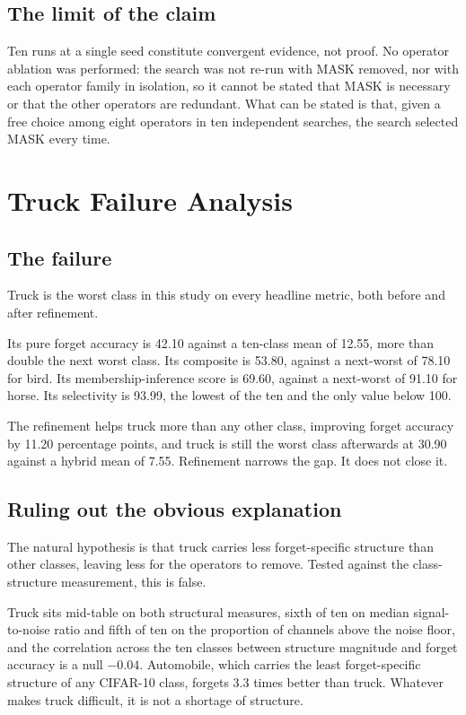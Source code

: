 \subsection{The limit of the claim}

Ten runs at a single seed constitute convergent evidence, not proof. No operator
ablation was performed: the search was not re-run with MASK removed, nor with each
operator family in isolation, so it cannot be stated that MASK is necessary or
that the other operators are redundant. What can be stated is that, given a free
choice among eight operators in ten independent searches, the search selected MASK
every time.

\section{Truck Failure Analysis}
\label{sec:exp-truck}

\subsection{The failure}

Truck is the worst class in this study on every headline metric, both before and
after refinement.

Its pure forget accuracy is 42.10 against a ten-class mean of 12.55, more than
double the next worst class. Its composite is 53.80, against a next-worst of 78.10
for bird. Its membership-inference score is 69.60, against a next-worst of 91.10
for horse. Its selectivity is 93.99, the lowest of the ten and the only value below
100.

The refinement helps truck more than any other class, improving forget accuracy by
11.20 percentage points, and truck is still the worst class afterwards at 30.90
against a hybrid mean of 7.55. Refinement narrows the gap. It does not close it.

\subsection{Ruling out the obvious explanation}

The natural hypothesis is that truck carries less forget-specific structure than
other classes, leaving less for the operators to remove. Tested against the
class-structure measurement, this is false.

Truck sits mid-table on both structural measures, sixth of ten on median
signal-to-noise ratio and fifth of ten on the proportion of channels above the
noise floor, and the correlation across the ten classes between structure
magnitude and forget accuracy is a null $-0.04$. Automobile, which carries the
least forget-specific structure of any CIFAR-10 class, forgets 3.3 times better
than truck. Whatever makes truck difficult, it is not a shortage of structure.

